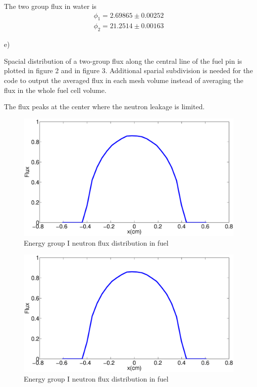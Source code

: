 \documentclass[a4paper, 12pt]{article} %
\begin{document}
The two group flux in water is 
\begin{eqnarray}
\phi_1 = 2.69865 \pm 0.00252 \nonumber\\
\phi_2 = 21.2514 \pm 0.00163 \nonumber
\end{eqnarray}

e)

Spacial distribution of a two-group flux along the central line of the fuel pin is
plotted in figure 2 and in figure 3. Additional sparial subdivision is needed for the code to output the averaged flux in each mesh volume instead of averaging the flux in the whole fuel cell volume.


The flux peaks at the center where the neutron leakage is limited.
\begin{figure}
\includegraphics[width = \textwidth]{prob2_x_g1.eps}
\caption{Energy group I neutron flux distribution in fuel}
\end{figure}

\begin{figure}
\includegraphics[width = \textwidth]{prob2_x_g2.eps}
\caption{Energy group I neutron flux distribution in fuel}
\end{figure}
\end{document}
